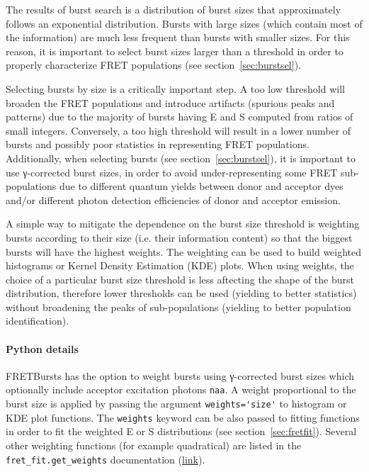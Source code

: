 The results of burst search is a distribution of burst sizes that approximately 
follows an exponential distribution.
Bursts with large sizes (which contain most of the information)
are much less frequent than bursts with smaller sizes. For this reason, it is 
important to select burst sizes larger than a threshold in order
to properly characterize FRET populations (see section~\ref{sec:burstsel}). 

Selecting bursts by size is a critically important step.
A too low threshold will broaden the FRET populations and introduce
artifacts (spurious peaks and patterns) due to the majority of bursts
having E and S computed from ratios of small integers. 
Conversely, a too high threshold will result in a lower number of bursts 
and possibly poor statistics in representing FRET populations.
Additionally, when selecting bursts (see section~\ref{sec:burstsel}), 
it is important to use γ-corrected burst sizes,
in order to avoid under-representing some FRET sub-populations
due to different quantum yields between donor and acceptor dyes and/or 
different photon detection efficiencies of donor and acceptor emission.

A simple way to mitigate the dependence on the burst size threshold is
weighting bursts according to their size (i.e. their information content)
so that the biggest bursts will have the highest weights.
The weighting can be used to build weighted histograms or Kernel Density 
Estimation (KDE) plots. When using weights, the choice of a particular 
burst size threshold is less aftecting the shape of the burst distribution,
therefore lower thresholds can be used (yielding to better statistics) 
without broadening the peaks of sub-populations (yielding to better 
population identification).

\paragraph{Python details}
FRETBursts has the option to weight bursts using γ-corrected 
burst sizes which optionally include acceptor excitation photons \verb|naa|.
A weight proportional to the burst size is applied by passing the argument 
\verb|weights='size'| to histogram or KDE plot functions. The \verb|weights|
keyword can be also passed to fitting functions in order to fit 
the weighted E or S distributions (see section~\ref{sec:fretfit}).
Several other weighting functions (for example quadratical) are listed in the
\verb|fret_fit.get_weights| documentation
(\href{http://fretbursts.readthedocs.org/en/latest/fret_fit.html#fretbursts.fret_fit.get_weights}{link}).

